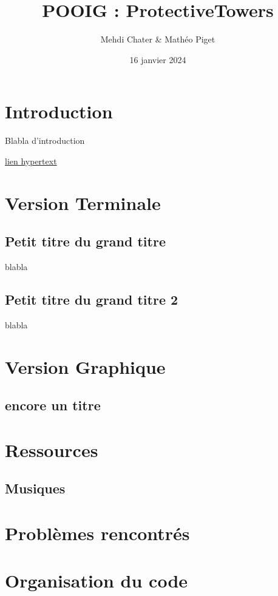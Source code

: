 \documentclass{article}
\title{POOIG : ProtectiveTowers}
\author{Mehdi Chater \& Mathéo Piget}
\date{16 janvier 2024}
\begin{document}
\maketitle


\section{Introduction}

Blabla d'introduction

\href{https://www.overleaf.com/learn}{lien hypertext}

\section{Version Terminale}

\subsection{Petit titre du grand titre}

blabla

\subsection{Petit titre du grand titre 2}

blabla

\section{Version Graphique}
\subsection{encore un titre}


\section{Ressources}
\subsection{Musiques}


\section{Problèmes rencontrés}
\section{Organisation du code}
\end{document}
